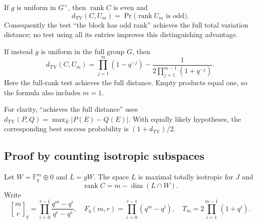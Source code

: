 \begin{theorem}
\label{thm:orthogonal-optimal-test}
If $g$ is uniform in $G^+$, then $\operatorname{rank}C$ is even and
\begin{equation}
 d_{\mathrm{TV}}(C,U_m)
   =\Pr\bigl(\operatorname{rank}U_m\text{ is odd}\bigr).
 \label{eq:SO-TV}
\end{equation}
Consequently the test ``the block has odd rank'' achieves the full
total variation distance; no test using all its entries improves this
distinguishing advantage.

If instead $g$ is uniform in the full group $G$, then
\begin{equation}
 d_{\mathrm{TV}}(C,U_m)
  =\prod_{j=1}^{m}(1-q^{-j})
    -\frac{1}{2\prod_{j=1}^{m-1}(1+q^{-j})}.
 \label{eq:O-TV}
\end{equation}
Here the full-rank test achieves the full distance. Empty products equal
one, so the formula also includes $m=1$.
\end{theorem}

For clarity, ``achieves the full distance'' uses
$d_{\mathrm{TV}}(P,Q)=\max_E|P(E)-Q(E)|$.
With equally likely hypotheses, the corresponding best success
probability is $(1+d_{\mathrm{TV}})/2$.

\subsection{Proof by counting isotropic subspaces}

Let $W=\mathbb F_q^m\oplus0$ and $L=gW$.
The space $L$ is maximal totally isotropic for $J$ and
\[
 \operatorname{rank}C=m-\dim(L\cap W).
\]
Write
\[
 {m\brack r}_q
 =\prod_{i=0}^{r-1}\frac{q^m-q^i}{q^r-q^i},\quad
 F_q(m,r)=\prod_{i=0}^{r-1}(q^m-q^i),\quad
 T_m=2\prod_{i=1}^{m-1}(1+q^i).
\]

